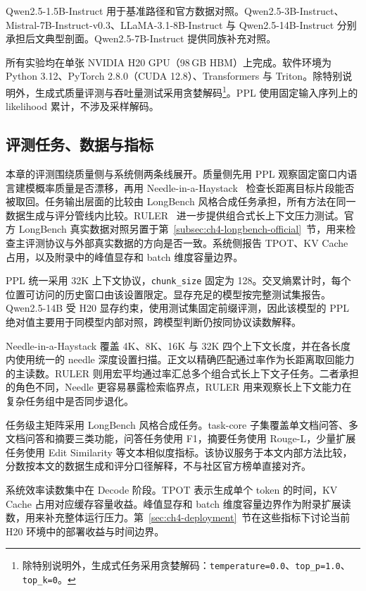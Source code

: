 Qwen2.5-1.5B-Instruct 用于基准路径和官方数据对照。Qwen2.5-3B-Instruct、Mistral-7B-Instruct-v0.3、LLaMA-3.1-8B-Instruct 与 Qwen2.5-14B-Instruct 分别承担后文典型剖面。Qwen2.5-7B-Instruct 提供同族补充对照。

所有实验均在单张 NVIDIA H20 GPU（98\,GB HBM）上完成。软件环境为 Python 3.12、PyTorch 2.8.0（CUDA 12.8）、Transformers 与 Triton。除特别说明外，生成式质量评测与吞吐量测试采用贪婪解码\footnote{除特别说明外，生成式任务采用贪婪解码：\texttt{temperature=0.0}、\texttt{top\_p=1.0}、\texttt{top\_k=0}。}。PPL 使用固定输入序列上的 likelihood 累计，不涉及采样解码。

\subsection{评测任务、数据与指标}
\label{subsec:ch4-benchmarks}
\label{subsec:exp-benchmarks}

本章的评测围绕质量侧与系统侧两条线展开。质量侧先用 PPL 观察固定窗口内语言建模概率质量是否漂移，再用 Needle-in-a-Haystack~\cite{kamradt2023needle} 检查长距离目标片段能否被取回。任务输出层面的比较由 LongBench 风格合成任务承担，所有方法在同一数据生成与评分管线内比较。RULER~\cite{hsieh2024ruler} 进一步提供组合式长上下文压力测试。官方 LongBench 真实数据对照另置于第~\ref{subsec:ch4-longbench-official}~节，用来检查主评测协议与外部真实数据的方向是否一致。系统侧报告 TPOT、KV Cache 占用，以及附录中的峰值显存和 batch 维度容量边界。

PPL 统一采用 32K 上下文协议，\texttt{chunk\_size} 固定为 128。交叉熵累计时，每个位置可访问的历史窗口由该设置限定。显存充足的模型按完整测试集报告。Qwen2.5-14B 受 H20 显存约束，使用测试集固定前缀评测，因此该模型的 PPL 绝对值主要用于同模型内部对照，跨模型判断仍按同协议读数解释。

Needle-in-a-Haystack 覆盖 4K、8K、16K 与 32K 四个上下文长度，并在各长度内使用统一的 needle 深度设置扫描。正文以精确匹配通过率作为长距离取回能力的主读数。RULER 则用宏平均通过率汇总多个组合式长上下文子任务。二者承担的角色不同，Needle 更容易暴露检索临界点，RULER 用来观察长上下文能力在复杂任务组中是否同步退化。

任务级主矩阵采用 LongBench 风格合成任务。task-core 子集覆盖单文档问答、多文档问答和摘要三类功能，问答任务使用 F1，摘要任务使用 Rouge-L，少量扩展任务使用 Edit Similarity 等文本相似度指标。该协议服务于本文内部方法比较，分数按本文的数据生成和评分口径解释，不与社区官方榜单直接对齐。

系统效率读数集中在 Decode 阶段。TPOT 表示生成单个 token 的时间，KV Cache 占用对应缓存容量收益。峰值显存和 batch 维度容量边界作为附录扩展读数，用来补充整体运行压力。第~\ref{sec:ch4-deployment}~节在这些指标下讨论当前 H20 环境中的部署收益与时间边界。

